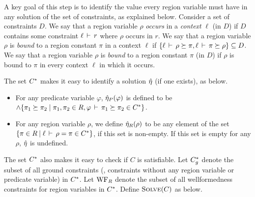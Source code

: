 A key goal of this step is to identify the value every region variable must
have in any solution of the set of constraints, as explained below.
%
%
Consider a set of constraints $D$. We say that a region variable $\rho$
\emph{occurs} in a \emph{context} $\ell$ (in $D$) if $D$ contains some
constraint $\ell\,\vdash\,r$ where $\rho$ occurs in $r$.
We say that a region variable $\rho$ is \emph{bound} to a region constant
$\pi$ in a context $\ell$ if
$\{ \ell\,\vdash\,\rho \succeq \pi, \ell\,\vdash\,\pi \succeq \rho \} \subseteq D$.
We say that a region variable $\rho$ is \emph{bound} to a region constant $\pi$ (in $D$) if
$\rho$ is bound to $\pi$ in every context $\ell$ in which it occurs.


The set ${C}^*$ makes it easy to identify a solution $\hat{\eta}$ (if one exists), as below.
\begin{itemize}
\item For any predicate variable $\varphi$, $\hat{\eta}_P(\varphi)$ is defined
to be $\wedge \{ \pi_1 \succeq \pi_2 \;|\; \pi_1, \pi_2 \in R, \varphi\,\vdash\,\pi_1 \succeq \pi_2 \in {C}^* \}$.
\item For any region variable $\rho$, we define $\hat{\eta}_R(\rho)$ to be any element of the
set $\{ \pi \in R \:|\; \ell\,\vdash\,\rho = \pi \in {C}^* \}$,
if this set is non-empty. If this set is empty for any $\rho$, $\hat{\eta}$ is undefined.
\end{itemize}



The set ${C}^*$ also makes it easy to check if $C$ is satisfiable.
Let ${C}^*_g$ denote the subset of all ground constraints
(\ie, constraints without any region variable or predicate variable)
in ${C}^*$. Let $\text{WF}_R$ denote the subset of all wellformedness
constraints for region variables in ${C}^*$.
Define $\textsc{Solve}(C)$ as below.


